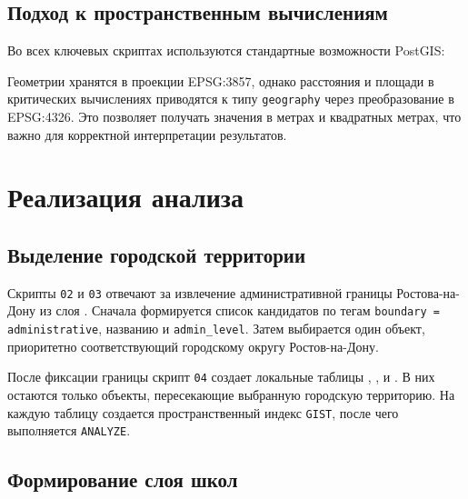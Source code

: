 \documentclass[a4paper,article,14pt]{extarticle}
\begin{document}
\subsection{Подход к пространственным вычислениям}

Во всех ключевых скриптах используются стандартные возможности PostGIS:

Геометрии хранятся в проекции EPSG:3857, однако расстояния и площади в
критических вычислениях приводятся к типу \texttt{geography} через преобразование
в EPSG:4326. Это позволяет получать значения в метрах и квадратных метрах, что
важно для корректной интерпретации результатов.

\section{Реализация анализа}

\subsection{Выделение городской территории}

Скрипты \texttt{02} и \texttt{03} отвечают за извлечение административной
границы Ростова-на-Дону из слоя . Сначала
формируется список кандидатов по тегам \texttt{boundary = administrative},
названию и \texttt{admin\_level}. Затем выбирается один объект, приоритетно
соответствующий городскому округу Ростов-на-Дону.

После фиксации границы скрипт \texttt{04} создает локальные таблицы
, ,
 и . В них
остаются только объекты, пересекающие выбранную городскую территорию. На каждую
таблицу создается пространственный индекс \texttt{GIST}, после чего выполняется
\texttt{ANALYZE}.

\subsection{Формирование слоя школ}
\end{document}
